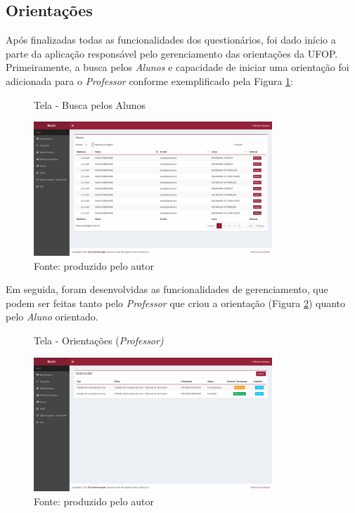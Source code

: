 \documentclass[
  12pt,       %
  openright,      %
  oneside,      %
  a4paper,      %
  english,      %
  french,        %
  spanish,     %
  brazil        %
  ]{abntex2-decsi}
\begin{document}
        \subsection{Orientações}
       
		Após finalizadas todas as funcionalidades dos questionários, foi dado início a parte da aplicação responsável pelo gerenciamento das orientações da UFOP. Primeiramente, a busca pelos \textit{Alunos} e capacidade de iniciar uma orientação foi adicionada para o \textit{Professor} conforme exemplificado pela Figura \ref{fig:alunos_home}: 
        
        \begin{figure}[h]
        \centering
        \caption{Tela - Busca pelos Alunos}
        \includegraphics[width=0.8\textwidth]{img/alunos_home}
        \caption*{Fonte: produzido pelo autor}
        \label{fig:alunos_home}
        \end{figure}
		
        Em seguida, foram desenvolvidas as funcionalidades de gerenciamento, que podem ser feitas tanto pelo \textit{Professor} que criou a orientação (Figura \ref{fig:orientacoes_home}) quanto pelo \textit{Aluno} orientado.
        
        \begin{figure}[h]
        \centering
        \caption{Tela - Orientações (\textit{Professor)}}
        \includegraphics[width=0.8\textwidth]{img/orientacoes_home1}
        \caption*{Fonte: produzido pelo autor}
        \label{fig:orientacoes_home}
        \end{figure}
        
\end{document}
